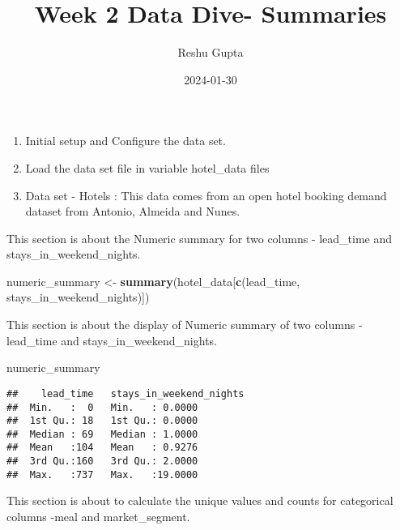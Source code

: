 \documentclass[
]{article}
\title{Week 2 Data Dive- Summaries}
\author{Reshu Gupta}
\date{2024-01-30}
\newenvironment{Shaded}{\begin{snugshade}}{\end{snugshade}}
\newcommand{\FunctionTok}[1]{\textcolor[rgb]{0.13,0.29,0.53}{\textbf{#1}}}
\newcommand{\NormalTok}[1]{#1}
\newcommand{\OtherTok}[1]{\textcolor[rgb]{0.56,0.35,0.01}{#1}}
\newcommand{\SpecialCharTok}[1]{\textcolor[rgb]{0.81,0.36,0.00}{\textbf{#1}}}
\newcommand{\StringTok}[1]{\textcolor[rgb]{0.31,0.60,0.02}{#1}}
\providecommand{\tightlist}{%
  \setlength{\itemsep}{0pt}\setlength{\parskip}{0pt}}
\begin{document}
\maketitle

\begin{enumerate}
\def\labelenumi{\arabic{enumi}.}
\tightlist
\item
  Initial setup and Configure the data set.
\item
  Load the data set file in variable hotel\_data files
\item
  Data set - Hotels : This data comes from an open hotel booking demand
  dataset from Antonio, Almeida and Nunes.
\end{enumerate}

This section is about the Numeric summary for two columns - lead\_time
and stays\_in\_weekend\_nights.

\begin{Shaded}
\begin{Highlighting}[]
\NormalTok{numeric\_summary }\OtherTok{\textless{}{-}} \FunctionTok{summary}\NormalTok{(hotel\_data[}\FunctionTok{c}\NormalTok{(}\StringTok{\textquotesingle{}lead\_time\textquotesingle{}}\NormalTok{, }\StringTok{\textquotesingle{}stays\_in\_weekend\_nights\textquotesingle{}}\NormalTok{)])}
\end{Highlighting}
\end{Shaded}

This section is about the display of Numeric summary of two columns -
lead\_time and stays\_in\_weekend\_nights.

\begin{Shaded}
\begin{Highlighting}[]
\NormalTok{numeric\_summary}
\end{Highlighting}
\end{Shaded}

\begin{verbatim}
##    lead_time   stays_in_weekend_nights
##  Min.   :  0   Min.   : 0.0000        
##  1st Qu.: 18   1st Qu.: 0.0000        
##  Median : 69   Median : 1.0000        
##  Mean   :104   Mean   : 0.9276        
##  3rd Qu.:160   3rd Qu.: 2.0000        
##  Max.   :737   Max.   :19.0000
\end{verbatim}

This section is about to calculate the unique values and counts for
categorical columns -meal and market\_segment.

\begin{Shaded}
\end{Shaded}
\end{document}
